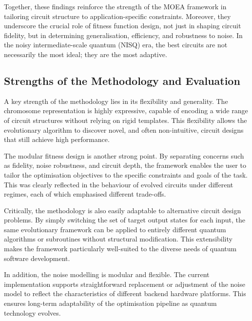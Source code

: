 \documentclass[11pt,a4paper]{article}
\begin{document}
Together, these findings reinforce the strength of the MOEA framework in tailoring circuit structure to application-specific constraints. Moreover, they underscore the crucial role of fitness function design, not just in shaping circuit fidelity, but in determining generalisation, efficiency, and robustness to noise. In the noisy intermediate-scale quantum (NISQ) era, the best circuits are not necessarily the most ideal; they are the most adaptive.\newline


\subsection{Strengths of the Methodology and Evaluation}\label{sec:strengths}
A key strength of the methodology lies in its flexibility and generality. The chromosome representation is highly expressive, capable of encoding a wide range of circuit structures without relying on rigid templates. This flexibility allows the evolutionary algorithm to discover novel, and often non-intuitive, circuit designs that still achieve high performance.\newline

The modular fitness design is another strong point. By separating concerns such as fidelity, noise robustness, and circuit depth, the framework enables the user to tailor the optimisation objectives to the specific constraints and goals of the task. This was clearly reflected in the behaviour of evolved circuits under different regimes, each of which emphasised different trade-offs.\newline

Critically, the methodology is also easily adaptable to alternative circuit design problems. By simply switching the set of target output states for each input, the same evolutionary framework can be applied to entirely different quantum algorithms or subroutines without structural modification. This extensibility makes the framework particularly well-suited to the diverse needs of quantum software development.\newline

In addition, the noise modelling is modular and flexible. The current implementation supports straightforward replacement or adjustment of the noise model to reflect the characteristics of different backend hardware platforms. This ensures long-term adaptability of the optimisation pipeline as quantum technology evolves.\newline
\end{document}
